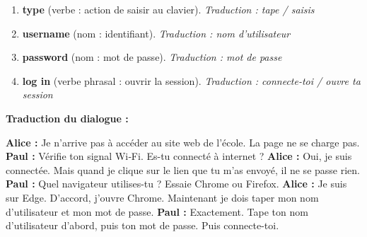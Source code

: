 \documentclass[11pt]{article}
\begin{document}
\begin{exoresolu}
\begin{enumerate}
\item \textbf{type} (verbe : action de saisir au clavier). \textit{Traduction : tape / saisis}
\item \textbf{username} (nom : identifiant). \textit{Traduction : nom d'utilisateur}
\item \textbf{password} (nom : mot de passe). \textit{Traduction : mot de passe}
\item \textbf{log in} (verbe phrasal : ouvrir la session). \textit{Traduction : connecte-toi / ouvre ta session}
\end{enumerate}
\par\medskip
\textbf{Traduction du dialogue :}
\par\medskip
\noindent\textbf{Alice :} Je n'arrive pas à accéder au site web de l'école. La page ne se charge pas.
\textbf{Paul :} Vérifie ton signal Wi‑Fi. Es-tu connecté à internet ?
\textbf{Alice :} Oui, je suis connectée. Mais quand je clique sur le lien que tu m'as envoyé, il ne se passe rien.
\textbf{Paul :} Quel navigateur utilises-tu ? Essaie Chrome ou Firefox.
\textbf{Alice :} Je suis sur Edge. D'accord, j'ouvre Chrome. Maintenant je dois taper mon nom d'utilisateur et mon mot de passe.
\textbf{Paul :} Exactement. Tape ton nom d'utilisateur d'abord, puis ton mot de passe. Puis connecte-toi.
\end{exoresolu}
\end{document}

